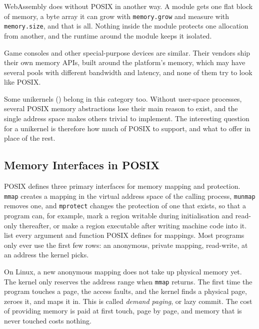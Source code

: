 \documentclass[12pt]{report}
\newcommand{\fullref}[1]{\Cref{#1}}
\renewcommand{\_}{\origunderscore\allowbreak}
\begin{document}
WebAssembly \cite{haas2017webassembly} does without POSIX in another way. A module gets one flat block of memory, a byte array it can grow with \texttt{memory.grow} and measure with \texttt{memory.size}, and that is all. Nothing inside the module protects one allocation from another, and the runtime around the module keeps it isolated.

Game consoles and other special-purpose devices are similar. Their vendors ship their own memory APIs, built around the platform's memory, which may have several pools with different bandwidth and latency, and none of them try to look like POSIX.

Some unikernels (\fullref{sec:unikernels}) belong in this category too. Without user-space processes, several POSIX memory abstractions lose their main reason to exist, and the single address space makes others trivial to implement. The interesting question for a unikernel is therefore how much of POSIX to support, and what to offer in place of the rest.

\subsection{Memory Interfaces in POSIX}
\label{sssec:posix-memory}

POSIX defines three primary interfaces for memory mapping and protection. \texttt{mmap} creates a mapping in the virtual address space of the calling process, \texttt{munmap} removes one, and \texttt{mprotect} changes the protection of one that exists, so that a program can, for example, mark a region writable during initialisation and read-only thereafter, or make a region executable after writing machine code into it.  list every argument and function POSIX defines for mappings. Most programs only ever use the first few rows: an anonymous, private mapping, read-write, at an address the kernel picks.

On Linux, a new anonymous mapping does not take up physical memory yet. The kernel only reserves the address range when \texttt{mmap} returns. The first time the program touches a page, the access faults, and the kernel finds a physical page, zeroes it, and maps it in. This is called \emph{demand paging}, or lazy commit. The cost of providing memory is paid at first touch, page by page, and memory that is never touched costs nothing.
\end{document}
